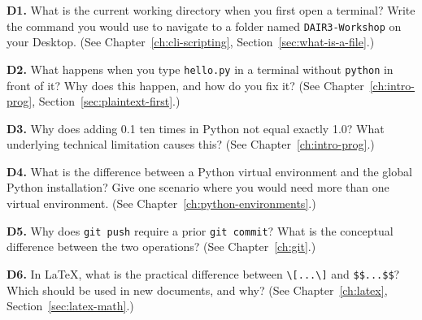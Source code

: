 \begin{Form}
\vs

\noindent\textbf{D1.} What is the current working directory when you
first open a terminal? Write the command you would use to navigate
to a folder named \texttt{DAIR3-Workshop} on your Desktop.
(See Chapter~\ref{ch:cli-scripting}, Section~\ref{sec:what-is-a-file}.)\\[4pt]
\TextField[name=d1,width=\linewidth,height=2.5cm,multiline=true,
           bordercolor=black]{}

\vs

\noindent\textbf{D2.} What happens when you type \texttt{hello.py}
in a terminal without \texttt{python} in front of it? Why does
this happen, and how do you fix it?
(See Chapter~\ref{ch:intro-prog}, Section~\ref{sec:plaintext-first}.)\\[4pt]
\TextField[name=d2,width=\linewidth,height=2.5cm,multiline=true,
           bordercolor=black]{}

\vs

\noindent\textbf{D3.} Why does adding 0.1 ten times in Python not
equal exactly 1.0? What underlying technical limitation causes this?
(See Chapter~\ref{ch:intro-prog}.)\\[4pt]
\TextField[name=d3,width=\linewidth,height=2.5cm,multiline=true,
           bordercolor=black]{}

\vs

\noindent\textbf{D4.} What is the difference between a Python virtual
environment and the global Python installation? Give one scenario
where you would need more than one virtual environment.
(See Chapter~\ref{ch:python-environments}.)\\[4pt]
\TextField[name=d4,width=\linewidth,height=2.5cm,multiline=true,
           bordercolor=black]{}

\vs

\noindent\textbf{D5.} Why does \texttt{git push} require a prior
\texttt{git commit}? What is the conceptual difference between
the two operations?
(See Chapter~\ref{ch:git}.)\\[4pt]
\TextField[name=d5,width=\linewidth,height=2.5cm,multiline=true,
           bordercolor=black]{}

\vs

\noindent\textbf{D6.} In \LaTeX{}, what is the practical difference
between \verb|\[...\]| and \verb|$$...$$|? Which should be used in
new documents, and why?
(See Chapter~\ref{ch:latex}, Section~\ref{sec:latex-math}.)\\[4pt]
\TextField[name=d6,width=\linewidth,height=2.5cm,multiline=true,
           bordercolor=black]{}


\end{Form}
